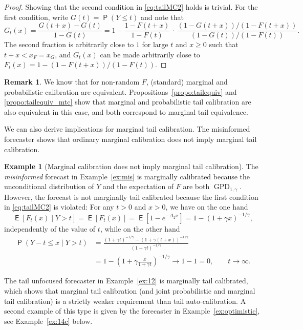 \documentclass[12pt]{article}
\newcommand{\E}{\operatorname{\mathsf{E}}}
\newcommand{\Q}{\operatorname{\mathsf{P}}}
\newcommand{\GPD}{\operatorname{GPD}} %
\newcommand{\point}{\,\cdot\,} %
\newcommand{\1}{\mathbf{1}} %
\theoremstyle{definition}
\newtheorem{remark}[propo]{Remark}
\newtheorem{example}[propo]{Example}
\begin{document}
\begin{proof} 
    Showing that the second condition in \eqref{eq:tailMC2} holds is trivial. For the first condition, write $G(t) = \Q(Y \le t)$ and note that
    \[
        G_t(x)
        = \frac{G(t+x)-G(t)}{1-G(t)}
        = 1 - \frac{1-F(t+x)}{1-F(t)} \point \frac{(1-G(t+x))/(1-F(t+x))}{(1-G(t))/(1-F(t))}.
    \]
    The second fraction is arbitrarily close to $1$ for large $t$ and $x \ge 0$ such that $t+x < x_F = x_G$, and $G_t(x)$ can be made arbitrarily close to $F_t(x) = 1 - (1-F(t+x))/(1-F(t))$.
\end{proof}

\begin{remark}
    We know that for non-random $F$, (standard) marginal and probabilistic calibration are equivalent. Propositions~\ref{propo:tailequiv} and \ref{propo:tailequiv_mtc} show that marginal and probabilistic tail calibration are also equivalent in this case, and both correspond to marginal tail equivalence.
\end{remark}


We can also derive implications for marginal tail calibration. The misinformed forecaster shows that ordinary marginal calibration does not imply marginal tail calibration.

\begin{example}[Marginal calibration does not imply marginal tail calibration]\label{ex:misinformed} 
    The \emph{misinformed} forecast in Example~\ref{ex:mis} is marginally calibrated because the unconditional distribution of $Y$ and the expectation of $F$ are both $\GPD_{1,\gamma}$. However, the forecast is not marginally tail calibrated because the first condition in \eqref{eq:tailMC2} is violated: For any $t > 0$ and $x > 0$, we have on the one hand
    \[
    	\E [F_{t}(x) \mid Y > t]
    	= \E[F_{t}(x)] 
    	= \E[1 - e^{-\Delta_2 x}]
    	= 1 - (1+\gamma x)^{-1/\gamma}, 
    \]
    independently of the value of $t$, while on the other hand
    \begin{align*}
    	\Q(Y-t\leq x \mid Y>t) 
    	&= \frac{(1+\gamma t)^{-1/\gamma}-(1+\gamma(t+x))^{-1/\gamma}}{(1+\gamma t)^{-1/\gamma}} \\
    	&= 1 - \left(1 + \gamma \frac{x}{1+\gamma t}\right)^{-1/\gamma}
    	\to 1 - 1 = 0, \qquad t \to \infty.
    \end{align*}
\end{example}

The tail unfocused forecaster in Example~\ref{ex:12} is marginally tail calibrated, which shows that marginal tail calibration (and joint probabilistic and marginal tail calibration) is a strictly weaker requirement than tail auto-calibration. A second example of this type is given by the forecaster in Example~\ref{ex:optimistic}, see Example~\ref{ex:14c} below.
\end{document}
